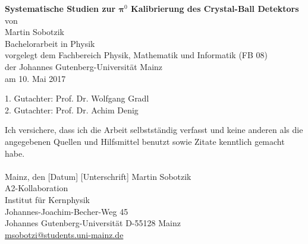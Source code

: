 \documentclass[a4paper,11pt,oneside,final,german,openbib,pdftex]{scrbook}
\begin{document}

\begin{titlepage}
  \vspace*{6mm}
  \begin{center}
     {\huge \bfseries Systematische Studien zur 
     	$
     										\bm{\pi}^0
     	$ 
     	Kalibrierung des Crystal-Ball Detektors}
     \\[3.5cm]
     {\large von}
     \\[3.5cm]
     {\dfont Martin Sobotzik}
     \\[2cm]
     {\large Bachelorarbeit in Physik \\
        vorgelegt dem Fachbereich Physik, Mathematik und Informatik (FB 08) \/\\
        der Johannes Gutenberg-Universit\"at Mainz \/\\
        am 10. Mai 2017}
   \end{center}
   \vfill
   1. Gutachter: Prof. Dr. Wolfgang Gradl\\	
   2. Gutachter: Prof. Dr. Achim Denig \\
   \vfill
\end{titlepage}

\thispagestyle{empty}
Ich versichere, dass ich die Arbeit selbstst\"andig verfasst und keine 
anderen als die angegebenen Quellen und Hilfsmittel benutzt sowie 
Zitate kenntlich gemacht habe.
\\
\\[3.5cm] 
Mainz, den [Datum] [Unterschrift]
\vfill
\noindent 
Martin Sobotzik\\
A2-Kollaboration\\
Institut f\"ur Kernphysik\\
Johannes-Joachim-Becher-Weg 45\\
Johannes Gutenberg-Universit\"at
D-55128 Mainz\\
{\url{ msobotzi@students.uni-mainz.de}}

\end{document}
